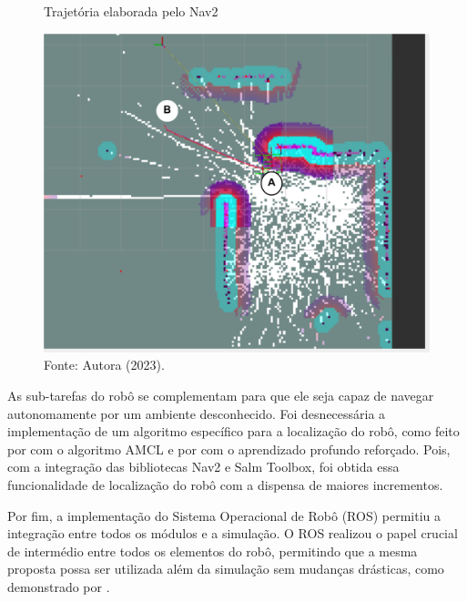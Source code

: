 \begin{figure}[H]
    \centering
    \caption{Trajetória elaborada pelo Nav2}
    \includegraphics[scale=0.4]{trajetoria.png}
    \caption*{Fonte: Autora (2023).}
    \label{fig:trajetoriaNav2}
\end{figure}

As sub-tarefas do robô se complementam para que ele seja capaz de navegar autonomamente por um ambiente desconhecido. Foi desnecessária a implementação de um algoritmo específico para a localização do robô, como feito por \citet{navegacaoSlam:2022} com o algoritmo AMCL e por \citet{dpoom} com o aprendizado profundo reforçado. Pois, com a integração das bibliotecas Nav2 e Salm Toolbox, foi obtida essa funcionalidade de localização do robô com a dispensa de maiores incrementos.

Por fim, a implementação do Sistema Operacional de Robô (ROS) permitiu a integração entre todos os módulos e a simulação. O ROS realizou o papel crucial de intermédio entre todos os elementos do robô, permitindo que a mesma proposta possa ser utilizada além da simulação sem mudanças drásticas, como demonstrado por \citet{navegacaoSlam:2022, dpoom, lidarRGBD}.

